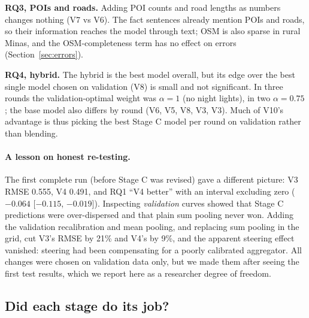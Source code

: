\documentclass[11pt,a4paper]{article}
\begin{document}
\textbf{RQ3, POIs and roads.} Adding POI counts and road lengths as numbers changes nothing (V7 vs V6). The fact
sentences already mention POIs and roads, so their information reaches the model through text; OSM is also sparse in
rural Minas, and the OSM-completeness term has no effect on errors (Section~\ref{sec:errors}).

\textbf{RQ4, hybrid.} The hybrid is the best model overall, but its edge over the best single model chosen on
validation (V8) is small and not significant. In three rounds the validation-optimal weight was $\alpha=1$ (no night
lights), in two $\alpha=0.75$; the base model also differs by round (V6, V5, V8, V3, V3). Much of V10's advantage is
thus picking the best Stage C model per round on validation rather than blending.

\paragraph{A lesson on honest re-testing.} The first complete run (before Stage C was revised) gave a different
picture: V3 RMSE 0.555, V4 0.491, and RQ1 ``V4 better'' with an interval excluding zero ($-0.064$ [$-0.115$,
$-0.019$]). Inspecting \emph{validation} curves showed that Stage C predictions were over-dispersed and that plain sum
pooling never won. Adding the validation recalibration and mean pooling, and replacing sum pooling in the grid, cut V3's
RMSE by 21\% and V4's by 9\%, and the apparent steering effect vanished: steering had been compensating for a
poorly calibrated aggregator. All changes were chosen on validation data only, but we made them after seeing the
first test results, which we report here as a researcher degree of freedom.

\subsection{Did each stage do its job?}
\end{document}

